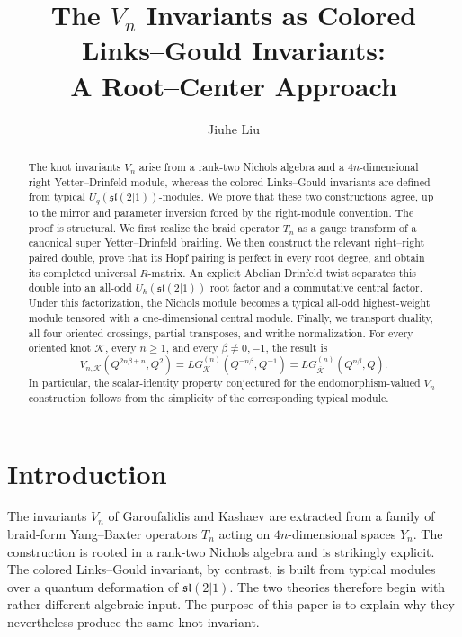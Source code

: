 \documentclass[11pt,a4paper]{article}
\title{The \(V_n\) Invariants as Colored Links--Gould Invariants:\\
A Root--Center Approach}
\author{Jiuhe Liu}
\date{}
\theoremstyle{definition}
\theoremstyle{remark}
\begin{document}
\maketitle

\begin{abstract}
The knot invariants \(V_n\) arise from a rank-two Nichols algebra and a
\(4n\)-dimensional right Yetter--Drinfeld module, whereas the colored
Links--Gould invariants are defined from typical
\(U_q(\mathfrak{sl}(2|1))\)-modules.  We prove that these two constructions
agree, up to the mirror and parameter inversion forced by the right-module
convention.  The proof is structural.  We first realize the braid operator
\(T_n\) as a gauge transform of a canonical super
Yetter--Drinfeld braiding.  We then construct the relevant right--right
paired double, prove that its Hopf pairing is perfect in every root degree,
and obtain its completed universal \(R\)-matrix.  An explicit Abelian
Drinfeld twist separates this double into an all-odd
\(U_\hbar(\mathfrak{sl}(2|1))\) root factor and a commutative central
factor.  Under this factorization, the Nichols module becomes a typical
all-odd highest-weight module tensored with a one-dimensional central
module.  Finally, we transport duality, all four oriented crossings,
partial transposes, and writhe normalization.  For every oriented knot
\(\mathcal K\), every \(n\geq 1\), and every
\(\beta\neq 0,-1\), the result is
\[
 V_{n,\mathcal K}\!\left(Q^{2n\beta+n},Q^2\right)
 =
 LG_{\mathcal K}^{(n)}\!\left(Q^{-n\beta},Q^{-1}\right)
 =
 LG_{\overline{\mathcal K}}^{(n)}\!\left(Q^{n\beta},Q\right).
\]
In particular, the scalar-identity property conjectured for the
endomorphism-valued \(V_n\) construction follows from the simplicity of
the corresponding typical module.
\end{abstract}

\tableofcontents

\section{Introduction}

The invariants \(V_n\) of Garoufalidis and Kashaev are extracted from a
family of braid-form Yang--Baxter operators \(T_n\) acting on
\(4n\)-dimensional spaces \(Y_n\).  The construction is rooted in a
rank-two Nichols algebra and is strikingly explicit.  The colored
Links--Gould invariant, by contrast, is built from typical modules over a
quantum deformation of \(\mathfrak{sl}(2|1)\).  The two theories therefore
begin with rather different algebraic input.  The purpose of this paper is
to explain why they nevertheless produce the same knot invariant.
\end{document}
